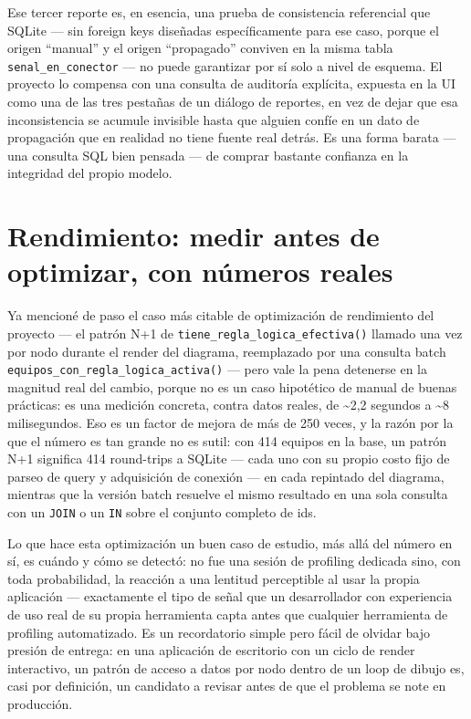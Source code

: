 \documentclass[11pt,twocolumn]{article}
\begin{document}
Ese tercer reporte es, en esencia, una prueba de consistencia referencial que SQLite --- sin foreign keys diseñadas específicamente para ese caso, porque el origen ``manual'' y el origen ``propagado'' conviven en la misma tabla \texttt{senal\_en\_conector} --- no puede garantizar por sí solo a nivel de esquema. El proyecto lo compensa con una consulta de auditoría explícita, expuesta en la UI como una de las tres pestañas de un diálogo de reportes, en vez de dejar que esa inconsistencia se acumule invisible hasta que alguien confíe en un dato de propagación que en realidad no tiene fuente real detrás. Es una forma barata --- una consulta SQL bien pensada --- de comprar bastante confianza en la integridad del propio modelo.

\section{Rendimiento: medir antes de optimizar, con números reales}

Ya mencioné de paso el caso más citable de optimización de rendimiento del proyecto --- el patrón N+1 de \texttt{tiene\_regla\_logica\_efectiva()} llamado una vez por nodo durante el render del diagrama, reemplazado por una consulta batch \texttt{equipos\_con\_regla\_logica\_activa()} --- pero vale la pena detenerse en la magnitud real del cambio, porque no es un caso hipotético de manual de buenas prácticas: es una medición concreta, contra datos reales, de \textasciitilde2{,}2 segundos a \textasciitilde8 milisegundos. Eso es un factor de mejora de más de 250 veces, y la razón por la que el número es tan grande no es sutil: con 414 equipos en la base, un patrón N+1 significa 414 round-trips a SQLite --- cada uno con su propio costo fijo de parseo de query y adquisición de conexión --- en cada repintado del diagrama, mientras que la versión batch resuelve el mismo resultado en una sola consulta con un \texttt{JOIN} o un \texttt{IN} sobre el conjunto completo de ids.

Lo que hace esta optimización un buen caso de estudio, más allá del número en sí, es cuándo y cómo se detectó: no fue una sesión de profiling dedicada sino, con toda probabilidad, la reacción a una lentitud perceptible al usar la propia aplicación --- exactamente el tipo de señal que un desarrollador con experiencia de uso real de su propia herramienta capta antes que cualquier herramienta de profiling automatizado. Es un recordatorio simple pero fácil de olvidar bajo presión de entrega: en una aplicación de escritorio con un ciclo de render interactivo, un patrón de acceso a datos por nodo dentro de un loop de dibujo es, casi por definición, un candidato a revisar antes de que el problema se note en producción.
\end{document}

